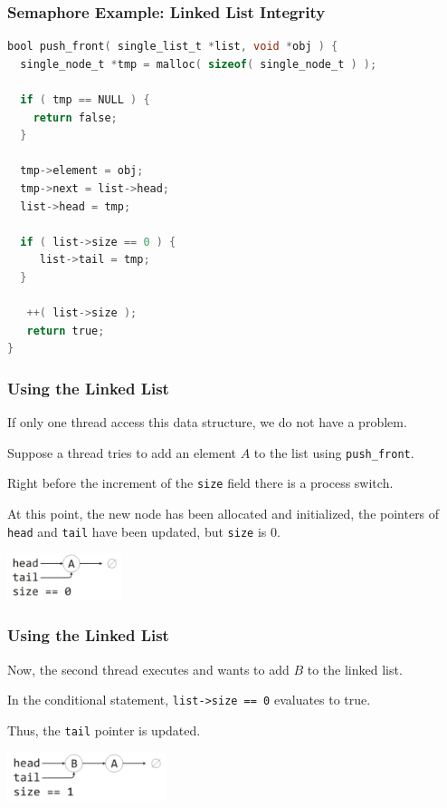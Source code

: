 \begin{frame}[fragile]
	\frametitle{Semaphore Example: Linked List Integrity}

	\begin{lstlisting}[language=C]
bool push_front( single_list_t *list, void *obj ) {
  single_node_t *tmp = malloc( sizeof( single_node_t ) );
  
  if ( tmp == NULL ) {
    return false;
  }
  
  tmp->element = obj;
  tmp->next = list->head;
  list->head = tmp;

  if ( list->size == 0 ) {
     list->tail = tmp;
  }
  
   ++( list->size );
   return true;
}

\end{lstlisting}
\end{frame}


\begin{frame}
	\frametitle{Using the Linked List}

	If only one thread access this data structure, we do not have a problem.

	Suppose a thread tries to add an element $A$ to the list using \texttt{push\_front}.

	Right before the increment of the \texttt{size} field there is a process switch.

	At this point, the new node has been allocated and initialized, the pointers of \texttt{head} and \texttt{tail} have been updated, but \texttt{size} is 0.

	\begin{center}
		\includegraphics[width=0.25\textwidth]{images/linkedlist1.png}
	\end{center}

\end{frame}

\begin{frame}
	\frametitle{Using the Linked List}

	Now, the second thread executes and wants to add $B$ to the linked list.

	In the conditional statement, \texttt{list->size == 0} evaluates to true.

	Thus, the \texttt{tail} pointer is updated.

	\begin{center}
		\includegraphics[width=0.35\textwidth]{images/linkedlist2.png}
	\end{center}


\end{frame}

